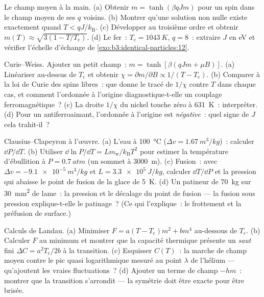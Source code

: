 \begin{exercise}[$\star\star$]\label{exo:b3:phase-transitions:5}
Le champ moyen à la main. (a) Obtenir $m = \tanh(\beta qJm)$ pour
un spin dans le champ moyen de ses $q$ voisins. (b) Montrer qu'une
solution non nulle existe exactement quand $T < qJ/k_{\text{B}}$.
(c) Développer au troisième ordre et obtenir $m(T) \approx \sqrt{3(1 -
T/T_{\text{c}})}$. (d) Le fer~: $T_{\text{c}} = \qty{1043}{K}$, $q =
8$~: extraire $J$ en eV et vérifier l'échelle d'échange de
\cref{exo:b3:identical-particles:12}.
\end{exercise}

\begin{exercise}[$\star\star$]\label{exo:b3:phase-transitions:6}
Curie--Weiss. Ajouter un petit champ~: $m = \tanh[\beta(qJm + \mu B)]$.
(a) Linéariser au-dessus de $T_{\text{c}}$ et obtenir $\chi = \partial
m/\partial B \propto 1/(T - T_{\text{c}})$. (b) Comparer à la loi de
Curie des spins libres~: que donne le tracé de $1/\chi$ contre $T$
dans chaque cas, et comment l'ordonnée à l'origine diagnostique-t-elle
un couplage ferromagnétique~? (c) La droite $1/\chi$ du nickel touche
zéro à \qty{631}{K}~: interpréter. (d) Pour un antiferroaimant,
l'ordonnée à l'origine est \emph{négative}~: quel signe de $J$ cela
trahit-il~?
\end{exercise}

\begin{exercise}[$\star\star$]\label{exo:b3:phase-transitions:7}
Clausius--Clapeyron à l'œuvre. (a) L'eau à \qty{100}{\celsius}
($\Delta v = \qty{1.67}{m^3/kg}$)~: calculer $\dd P/\dd T$. (b)
Utiliser $\dd\ln P/\dd T = Lm_{\text{w}}/k_{\text{B}}T^2$ pour
estimer la température d'ébullition à $P = \qty{0.7}{atm}$ (un
sommet à \qty{3000}{m}). (c) Fusion~: avec
$\Delta v = \qty{-9.1e-5}{m^3/kg}$ et $L = \qty{3.3e5}{J/kg}$,
calculer $\dd T/\dd P$ et la pression qui abaisse le point de fusion
de la glace de \qty{5}{K}. (d) Un patineur de \qty{70}{kg} sur
\qty{30}{mm^2} de lame~: la pression et le décalage du point de
fusion --- la fusion sous pression explique-t-elle le patinage~? (Ce
qui l'explique~: le frottement et la préfusion de surface.)
\end{exercise}

\begin{exercise}[$\star\star$]\label{exo:b3:phase-transitions:8}
Calculs de Landau. (a) Minimiser $F = a(T - T_{\text{c}})m^2 +
bm^4$ au-dessous de $T_{\text{c}}$. (b) Calculer $F$ au minimum et
montrer que la capacité thermique présente un \emph{saut} fini $\Delta C =
a^2T_{\text{c}}/2b$ à la transition. (c) Esquisser $C(T)$~: la
marche de champ moyen contre le pic quasi logarithmique mesuré au
point $\lambda$ de l'hélium --- qu'ajoutent les vraies
fluctuations~? (d) Ajouter un terme de champ $-hm$~: montrer que la
transition s'arrondit --- la symétrie doit être exacte pour être
brisée.
\end{exercise}

